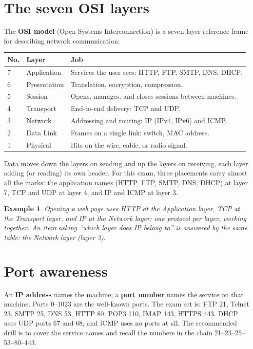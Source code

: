 \documentclass[11pt]{article}
\newtheorem{example}{Example}[section]
\begin{document}
\section{The seven OSI layers}
The \textbf{OSI model} (Open Systems Interconnection) is a seven-layer
reference frame for describing network communication:

\begin{center}
\begin{tabular}{p{}p{}p{}}
\toprule
\textbf{No.} & \textbf{Layer} & \textbf{Job} \\
\midrule
7 & Application & Services the user sees: HTTP, FTP, SMTP, DNS, DHCP. \\
6 & Presentation & Translation, encryption, compression. \\
5 & Session & Opens, manages, and closes sessions between machines. \\
4 & Transport & End-to-end delivery: TCP and UDP. \\
3 & Network & Addressing and routing: IP (IPv4, IPv6) and ICMP. \\
2 & Data Link & Frames on a single link: switch, MAC address. \\
1 & Physical & Bits on the wire, cable, or radio signal. \\
\bottomrule
\end{tabular}
\end{center}

Data moves down the layers on sending and up the layers on receiving, each
layer adding (or reading) its own header. For this exam, three placements
carry almost all the marks: the application names (HTTP, FTP, SMTP, DNS,
DHCP) at layer 7, TCP and UDP at layer 4, and IP and ICMP at layer 3.

\begin{example}
Opening a web page uses HTTP at the Application layer, TCP at the Transport
layer, and IP at the Network layer: one protocol per layer, working
together. An item asking ``which layer does IP belong to'' is answered by
the same table: the Network layer (layer 3).
\end{example}

\section{Port awareness}
An \textbf{IP address} names the machine; a \textbf{port number} names the
service on that machine. Ports 0--1023 are the well-known ports. The exam set
is: FTP 21, Telnet 23, SMTP 25, DNS 53, HTTP 80, POP3 110, IMAP 143, HTTPS
443. DHCP uses UDP ports 67 and 68, and ICMP uses no ports at all. The
recommended drill is to cover the service names and recall the numbers in the
chain 21--23--25--53--80--443.
\end{document}
